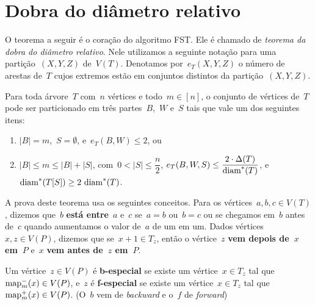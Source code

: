 \section {Dobra do diâmetro relativo}
\label{sec:dobraDiametro}
	O teorema a seguir é o coração do algoritmo FST.
	Ele é chamado de \textit{teorema da dobra do diâmetro relativo}.	
	Nele utilizamos a seguinte notação para uma partição~$(X, Y, Z)$
	de~$V(T)$.
	Denotamos por~$e_T(X,Y,Z)$ o número de arestas de~$T$ cujos extremos
	estão em conjuntos distintos da partição~$(X,Y,Z)$.


		\begin{teo}
		\label{teo:dobraDiametro}
			Para toda árvore~$T$ com~$n$ vértices e 
			todo~${m\in [n]}$,
			o conjunto de vértices de~$T$ pode ser particionado em 
			três partes~$B$,~$W$ e~$S$ tais que vale um dos 
			seguintes itens:
			\begin{enumerate}
				\item ${|B|=m}$,~${S=\emptyset}$, e~${e_T(B,W)\le 2}$, ou
				\item ${|B|\le m\le |B|+|S|}$, 
				com~${0<|S|\le\dfrac{n}{2}}$,
				${e_T(B,W,S)\le \dfrac{2\cdot 
				\Delta(T)}{\mathrm{diam}^*(T)}}$, 
				e~${\mathrm{diam}^*(T[S])\ge 2\ \mathrm{diam}^*(T)}$.
			\end{enumerate}
		\end{teo}

	\bigskip
	\bigskip
	
	A prova deste teorema usa os seguintes conceitos.
	Para os vértices~${a,b,c\in V(T)}$, dizemos que~$b$
	\textbf{está entre}~$a$ e~$c$ se~${a=b}$ ou~${b=c}$ 
	ou se chegamos em~$b$ antes
	de~$c$ quando aumentamos o valor de~$a$  
	de um em um.
	Dados vértices~${x,z\in V(P)}$, dizemos que 
	se~${x+1\in T_z}$, então o
	vértice~$z$ \textbf{vem depois de~$x$ em~$P$} 
	e~$x$ \textbf{vem antes de~$z$ em~$P$}.


	Um vértice~${z\in V(P)}$ é \textbf{b-especial}
	se existe um vértice~${x\in T_z}$ tal 
	que~${\mathrm{map}^{-}_m(x)\in V(P)}$, e~$z$ é
	\textbf{f-especial} se existe um vértice~${x\in T_z}$
	tal que~${\mathrm{map}^{+}_m(x)\in V(P)}$.
	(O~$b$ vem de {\it backward} e o~$f$ de {\it forward})

	\bigskip
	\bigskip


